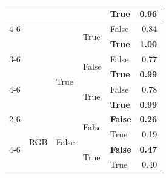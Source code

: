 \begin{tabular}{@{}lllllr@{}}
                                                                        &                                 &                           &                           & \textbf{True}         & \textbf{0.96} \\
    \cmidrule{4-6}              
                                                                        &                                 &                           & \multirow[c]{2}{*}{True}  & False                 & 0.84 \\
                                                                        &                                 &                           &                           & \textbf{True}         & \textbf{1.00} \\
    \cmidrule{3-6}              
                                                                        &                                 & \multirow[c]{4}{*}{True}  & \multirow[c]{2}{*}{False} & False                 & 0.77 \\
                                                                        &                                 &                           &                           & \textbf{True}         & \textbf{0.99} \\
    \cmidrule{4-6}              
                                                                        &                                 &                           & \multirow[c]{2}{*}{True}  & False                 & 0.78 \\
                                                                        &                                 &                           &                           & \textbf{True}         & \textbf{0.99} \\
    \cmidrule{2-6}              
                                                                        & \multirow[c]{9}{*}{RGB}         & \multirow[c]{4}{*}{False} & \multirow[c]{2}{*}{False} & \textbf{False}        & \textbf{0.26} \\
                                                                        &                                 &                           &                           & True                  & 0.19 \\
    \cmidrule{4-6}              
                                                                        &                                 &                           & \multirow[c]{2}{*}{True}  & \textbf{False}        & \textbf{0.47} \\
                                                                        &                                 &                           &                           & True                  & 0.40 \\

\end{tabular}
